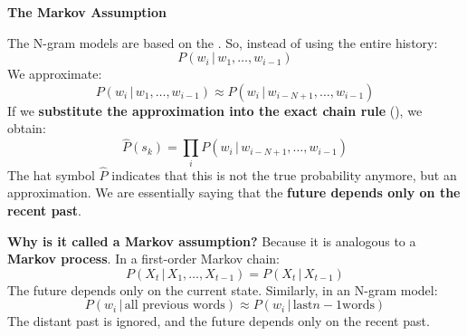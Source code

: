 \highspace
\begin{flushleft}
    \textcolor{Green3}{ \textbf{The Markov Assumption}}
\end{flushleft}
The N-gram models are based on the . So, instead of using the entire history:
\begin{equation*}
    P\left(w_i \, | \, w_{1}, \dots, w_{i-1}\right)
\end{equation*}
We approximate:
\begin{equation}
    P\left(w_i \, | \, w_{1}, \dots, w_{i-1}\right) \approx P\left(w_i \, | \, w_{i-N+1}, \dots, w_{i-1}\right)
\end{equation}
If we \textbf{substitute the approximation into the exact chain rule} (), we obtain:
\begin{equation}\label{eq:ngram-approximation-of-sentence-probability}
    \hat{P}\left(s_k\right) = \prod_{i} P\left(w_{i} \, | \, w_{i-N+1}, \dots, w_{i-1}\right)
\end{equation}
The hat symbol $\hat{P}$ indicates that this is not the true probability anymore, but an approximation. We are essentially saying that the \textbf{future depends only on the recent past}.

\highspace
\textcolor{Green3}{ \textbf{Why is it called a Markov assumption?}} Because it is analogous to a \textbf{Markov process}. In a first-order Markov chain:
\begin{equation*}
    P\left(X_t \, | \, X_1 , \dots, X_{t-1}\right) = P\left(X_t \, | \, X_{t-1}\right)
\end{equation*}
The future depends only on the current state. Similarly, in an N-gram model:
\begin{equation*}
    P\left(w_i \, | \, \text{all previous words}\right) \approx P\left(w_i \, | \, \text{last} n-1 \text{words}\right)
\end{equation*}
The distant past is ignored, and the future depends only on the recent past.

